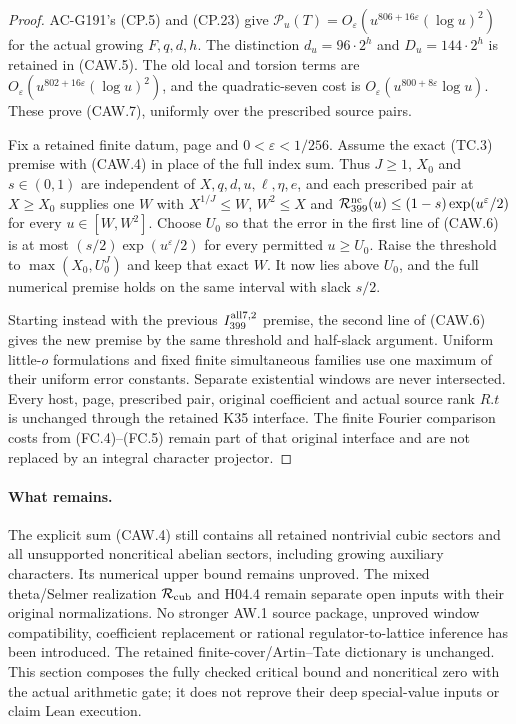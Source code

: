 \begin{proof}
AC-G191's (CP.5) and (CP.23) give
$\mathcal P_u(T)=O_\varepsilon(u^{806+16\varepsilon}(\log u)^2)$
for the actual growing $F,q,d,h$.
The distinction $d_u=96\cdot2^h$ and $D_u=144\cdot2^h$
is retained in (CAW.5).
The old local and torsion terms are
$O_\varepsilon(u^{802+16\varepsilon}(\log u)^2)$,
and the quadratic-seven cost is
$O_\varepsilon(u^{800+8\varepsilon}\log u)$.
These prove (CAW.7), uniformly over the prescribed source pairs.

Fix a retained finite datum, page and $0<\varepsilon<1/256$.
Assume the exact (TC.3) premise with (CAW.4) in place of the
full index sum.  Thus $J\geq1$, $X_0$ and $s\in(0,1)$ are
independent of $X,q,d,u,\ell,\eta,e$, and each prescribed pair
at $X\geq X_0$ supplies one $W$ with $X^{1/J}\leq W$,
$W^2\leq X$ and
$\mathcal R_{399}^{\rm nc}(u)\leq(1-s)\exp(u^\varepsilon/2)$
for every $u\in[W,W^2]$.
Choose $U_0$ so that the error in the first line of (CAW.6)
is at most $(s/2)\exp(u^\varepsilon/2)$ for every permitted
$u\geq U_0$.
Raise the threshold to $\max(X_0,U_0^J)$ and keep that exact $W$.
It now lies above $U_0$, and the full numerical premise holds
on the same interval with slack $s/2$.

Starting instead with the previous $I_{399}^{\rm all7,2}$
premise, the second line of (CAW.6) gives the new premise by
the same threshold and half-slack argument.
Uniform little-$o$ formulations and fixed finite simultaneous
families use one maximum of their uniform error constants.
Separate existential windows are never intersected.
Every host, page, prescribed pair, original coefficient and actual
source rank $R.t$ is unchanged through the retained K35 interface.
The finite Fourier comparison costs from (FC.4)--(FC.5) remain
part of that original interface and are not replaced by an
integral character projector.
\end{proof}

\paragraph{What remains.}
The explicit sum (CAW.4) still contains all retained nontrivial
cubic sectors and all unsupported noncritical abelian sectors,
including growing auxiliary characters.
Its numerical upper bound remains unproved.
The mixed theta/Selmer realization $\mathcal R_{\rm cub}$ and
H04.4 remain separate open inputs with their original normalizations.
No stronger AW.1 source package, unproved window compatibility,
coefficient replacement or rational regulator-to-lattice inference
has been introduced.  The retained finite-cover/Artin--Tate
dictionary is unchanged.  This section composes the fully checked
critical bound and noncritical zero with the actual arithmetic
gate; it does not reprove their deep special-value inputs or
claim Lean execution.
